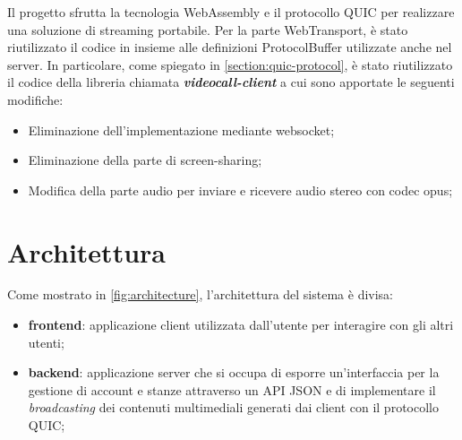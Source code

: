 \documentclass{article}
\begin{document}
Il progetto sfrutta la tecnologia WebAssembly e il protocollo QUIC per realizzare una 
soluzione di streaming portabile. Per la parte WebTransport, è stato riutilizzato
il codice in \cite{VideoCallRs} insieme alle definizioni ProtocolBuffer utilizzate 
anche nel server. In particolare,
come spiegato in \cref{section:quic-protocol}, è stato riutilizzato il codice della libreria chiamata
\textbf{\textit{videocall-client}} a cui sono apportate le seguenti modifiche:
\begin{itemize}
  \item Eliminazione dell'implementazione mediante websocket;
  \item Eliminazione della parte di screen-sharing;
  \item Modifica della parte audio per inviare e ricevere audio stereo con codec opus;
\end{itemize}

\clearpage


\section{Architettura}
Come mostrato in \cref{fig:architecture}, l'architettura del sistema è divisa:
\begin{itemize}
  \item \textbf{frontend}: applicazione client utilizzata dall'utente per interagire con 
    gli altri utenti;
  \item \textbf{backend}: applicazione server che si occupa di esporre un'interfaccia 
    per la gestione di account e stanze attraverso un API JSON e di implementare il 
    \textit{broadcasting} dei contenuti multimediali generati dai client con il protocollo
    QUIC;
\end{itemize}
\end{document}
